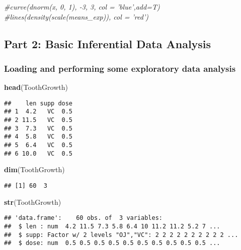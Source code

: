 \documentclass[]{article}
\newenvironment{Shaded}{\begin{snugshade}}{\end{snugshade}}
\newcommand{\KeywordTok}[1]{\textcolor[rgb]{0.13,0.29,0.53}{\textbf{#1}}}
\newcommand{\CommentTok}[1]{\textcolor[rgb]{0.56,0.35,0.01}{\textit{#1}}}
\newcommand{\NormalTok}[1]{#1}
\begin{document}
\begin{Shaded}
\begin{Highlighting}[]
\CommentTok{#curve(dnorm(x, 0, 1), -3, 3, col = 'blue',add=T) }
\CommentTok{#lines(density(scale(means_exp)), col = 'red')}
\end{Highlighting}
\end{Shaded}

\subsection{Part 2: Basic Inferential Data
Analysis}\label{part-2-basic-inferential-data-analysis}

\subsubsection{Loading and performing some exploratory data
analysis}\label{loading-and-performing-some-exploratory-data-analysis}

\begin{Shaded}
\begin{Highlighting}[]
\KeywordTok{head}\NormalTok{(ToothGrowth)}
\end{Highlighting}
\end{Shaded}

\begin{verbatim}
##    len supp dose
## 1  4.2   VC  0.5
## 2 11.5   VC  0.5
## 3  7.3   VC  0.5
## 4  5.8   VC  0.5
## 5  6.4   VC  0.5
## 6 10.0   VC  0.5
\end{verbatim}

\begin{Shaded}
\begin{Highlighting}[]
\KeywordTok{dim}\NormalTok{(ToothGrowth)}
\end{Highlighting}
\end{Shaded}

\begin{verbatim}
## [1] 60  3
\end{verbatim}

\begin{Shaded}
\begin{Highlighting}[]
\KeywordTok{str}\NormalTok{(ToothGrowth)}
\end{Highlighting}
\end{Shaded}

\begin{verbatim}
## 'data.frame':    60 obs. of  3 variables:
##  $ len : num  4.2 11.5 7.3 5.8 6.4 10 11.2 11.2 5.2 7 ...
##  $ supp: Factor w/ 2 levels "OJ","VC": 2 2 2 2 2 2 2 2 2 2 ...
##  $ dose: num  0.5 0.5 0.5 0.5 0.5 0.5 0.5 0.5 0.5 0.5 ...
\end{verbatim}
\end{document}
